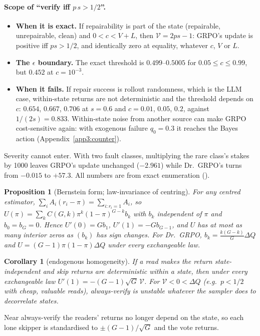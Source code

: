 \documentclass[11pt]{article}
\newtheorem{proposition}{Proposition}
\newtheorem{corollary}{Corollary}
\begin{document}
\paragraph{Scope of ``verify iff $p\,s>1/2$''.}
\begin{itemize}
\item \textbf{When it is exact.} If repairability is part of the state (repairable, unrepairable, clean) and
$0<c<V+L$, then $\mathcal V=2ps-1$: GRPO's update is positive iff $ps>1/2$, and identically zero at equality, whatever
$c$, $V$ or $L$.
\item \textbf{The $\epsilon$ boundary.} The exact threshold is $0.499$--$0.5005$ for $0.05\le c\le0.99$, but $0.452$
at $c=10^{-3}$.
\item \textbf{When it fails.} If repair success is rollout randomness, which is the LLM case, within-state returns are
not deterministic and the threshold depends on $c$: $0.654$, $0.667$, $0.706$ at $s=0.6$ and $c=0.01$, $0.05$, $0.2$,
against $1/(2s)=0.833$. Within-state noise from another source can make GRPO cost-sensitive again: with exogenous
failure $q_0=0.3$ it reaches the Bayes action (Appendix~\ref{app3:counter}).
\end{itemize}
Severity cannot enter. With two fault classes, multiplying the rare class's stakes by 1000 leaves GRPO's update
unchanged ($-2.961$) while Dr.~GRPO's turns from $-0.015$ to $+57.3$. All numbers are from exact enumeration
().

\begin{proposition}[Bernstein form; law-invariance of centring]\label{prop:bern}
For any centred estimator, $\sum_iA_i(r_i-\pi)=\sum_{i:r_i=1}A_i$, so
$U(\pi)=\sum_{k}C(G,k)\pi^k(1-\pi)^{G-k}b_k$ with $b_k$ independent of $\pi$ and $b_0=b_G=0$. Hence
$U'(0)=Gb_1$, $U'(1)=-Gb_{G-1}$, and $U$ has at most as many interior zeros as $(b_k)$ has sign changes. For
Dr.~GRPO, $b_k=\tfrac{k(G-k)}{G}\Delta Q$ and $U=(G-1)\pi(1-\pi)\Delta Q$ \emph{under every exchangeable law}.
\end{proposition}

\begin{corollary}[endogenous homogeneity]\label{cor:homog}
If a read makes the return state-independent and skip returns are deterministic within a state, then under every
exchangeable law $U'(1)=-(G-1)\sqrt G\,\mathcal V$. For $\mathcal V<0<\Delta Q$ (e.g.\ $p<1/2$ with cheap, valuable
reads), always-verify is unstable whatever the sampler does to decorrelate states.
\end{corollary}
\noindent Near always-verify the readers' returns no longer depend on the state, so each lone skipper is
standardised to $\pm(G-1)/\sqrt G$ and the vote returns.
\end{document}
